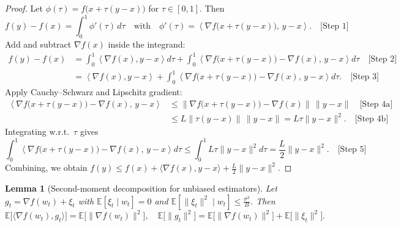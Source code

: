 \documentclass[11pt]{article}
\newtheorem{lemma}{Lemma}
\newcommand{\E}{\mathbb{E}}
\begin{document}
\begin{proof}
Let $\phi(\tau)=f\big(x+\tau(y-x)\big)$ for $\tau\in[0,1]$. Then
\[
f(y)-f(x) = \int_0^1 \phi'(\tau)\,d\tau \quad \text{with}\quad \phi'(\tau)=\left\langle \nabla f\big(x+\tau(y-x)\big),\, y-x\right\rangle. \quad \text{[Step 1]}
\]
Add and subtract $\nabla f(x)$ inside the integrand:
\begin{align*}
f(y)-f(x)
&= \int_0^1 \left\langle \nabla f(x), y-x\right\rangle d\tau
  + \int_0^1 \left\langle \nabla f\big(x+\tau(y-x)\big)-\nabla f(x),\, y-x\right\rangle d\tau \quad \text{[Step 2]}\\
&= \left\langle \nabla f(x), y-x\right\rangle
  + \int_0^1 \left\langle \nabla f\big(x+\tau(y-x)\big)-\nabla f(x),\, y-x\right\rangle d\tau. \quad \text{[Step 3]}
\end{align*}
Apply Cauchy--Schwarz and Lipschitz gradient:
\begin{align*}
\left\langle \nabla f\big(x+\tau(y-x)\big)-\nabla f(x),\, y-x\right\rangle
&\le \left\|\nabla f\big(x+\tau(y-x)\big)-\nabla f(x)\right\|\,\|y-x\| \quad \text{[Step 4a]}\\
&\le L\| \tau(y-x)\|\,\|y-x\| = L\tau \|y-x\|^2. \quad \text{[Step 4b]}
\end{align*}
Integrating w.r.t.\ $\tau$ gives
\[
\int_0^1 \left\langle \nabla f\big(x+\tau(y-x)\big)-\nabla f(x),\, y-x\right\rangle d\tau
\le \int_0^1 L\tau \|y-x\|^2 d\tau = \frac{L}{2}\|y-x\|^2. \quad \text{[Step 5]}
\]
Combining, we obtain $f(y)\le f(x)+\langle \nabla f(x), y-x\rangle + \frac{L}{2}\|y-x\|^2$.
\end{proof}

\begin{lemma}[Second-moment decomposition for unbiased estimators]
\label{lem:second-moment}
Let $g_t=\nabla f(w_t)+\xi_t$ with $\E[\xi_t\mid w_t]=0$ and $\E[\|\xi_t\|^2\mid w_t]\le \frac{\sigma^2}{B}$. Then
\[
\E\big[\langle \nabla f(w_t), g_t\rangle\big]=\E\big[\|\nabla f(w_t)\|^2\big], \quad
\E\big[\|g_t\|^2\big]=\E\big[\|\nabla f(w_t)\|^2\big]+\E\big[\|\xi_t\|^2\big].
\]
\end{lemma}
\end{document}
